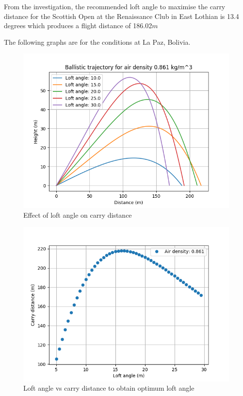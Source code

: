 \documentclass[12pt]{article}
\begin{document}
From the investigation, the recommended loft angle to maximise the carry distance for the Scottish Open at the Renaissance Club in East Lothian is 13.4 degrees which produces a flight distance of 186.02$m$

The following graphs are for the conditions at La Paz, Bolivia.

\begin{figure}[H]
\centering
\caption{Effect of loft angle on carry distance}
\includegraphics[scale=0.6]{results0861}
\end{figure}

\begin{figure}[H]
\centering
\caption{Loft angle vs carry distance to obtain optimum loft angle}
\includegraphics[scale=0.6]{results0861range}
\end{figure}
\end{document}
